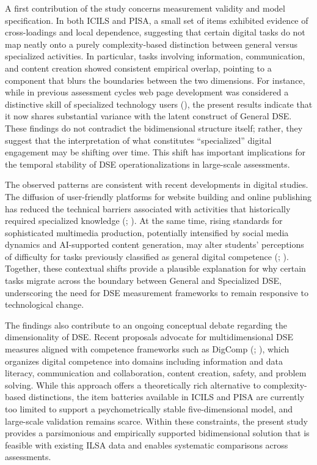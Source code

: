 \documentclass[
  letterpaper,
  DIV=11,
  numbers=noendperiod]{scrartcl}
\begin{document}
A first contribution of the study concerns measurement validity and
model specification. In both ICILS and PISA, a small set of items
exhibited evidence of cross-loadings and local dependence, suggesting
that certain digital tasks do not map neatly onto a purely
complexity-based distinction between general versus specialized
activities. In particular, tasks involving information, communication,
and content creation showed consistent empirical overlap, pointing to a
component that blurs the boundaries between the two dimensions. For
instance, while in previous assessment cycles web page development was
considered a distinctive skill of specialized technology users
(), the present
results indicate that it now shares substantial variance with the latent
construct of General DSE. These findings do not contradict the
bidimensional structure itself; rather, they suggest that the
interpretation of what constitutes ``specialized'' digital engagement
may be shifting over time. This shift has important implications for the
temporal stability of DSE operationalizations in large-scale
assessments.

The observed patterns are consistent with recent developments in digital
studies. The diffusion of user-friendly platforms for website building
and online publishing has reduced the technical barriers associated with
activities that historically required specialized knowledge
(;
). At the
same time, rising standards for sophisticated multimedia production,
potentially intensified by social media dynamics and AI-supported
content generation, may alter students' perceptions of difficulty for
tasks previously classified as general digital competence
(;
).
Together, these contextual shifts provide a plausible explanation for
why certain tasks migrate across the boundary between General and
Specialized DSE, underscoring the need for DSE measurement frameworks to
remain responsive to technological change.

The findings also contribute to an ongoing conceptual debate regarding
the dimensionality of DSE. Recent proposals advocate for
multidimensional DSE measures aligned with competence frameworks such as
DigComp
(;
), which organizes digital competence into domains including
information and data literacy, communication and collaboration, content
creation, safety, and problem solving. While this approach offers a
theoretically rich alternative to complexity-based distinctions, the
item batteries available in ICILS and PISA are currently too limited to
support a psychometrically stable five-dimensional model, and
large-scale validation remains scarce. Within these constraints, the
present study provides a parsimonious and empirically supported
bidimensional solution that is feasible with existing ILSA data and
enables systematic comparisons across assessments.
\end{document}
